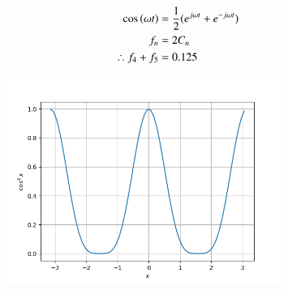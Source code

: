 \documentclass[journal,12pt,onecolumn]{IEEEtran}
\theoremstyle{remark}
\begin{document}
\begin{align}
\cos\left(\omega t\right) &= \frac{1}{2}(e^{j\omega t}+e^{-j\omega t}) \\
f_n &= 2C_n \\
\therefore f_4 + f_5 &= 0.125
\end{align}
\begin{figure}[ht]
	\centering
	\includegraphics[width=0.8\textwidth]{./figs/fig1.png}
\end{figure}
\end{document}
